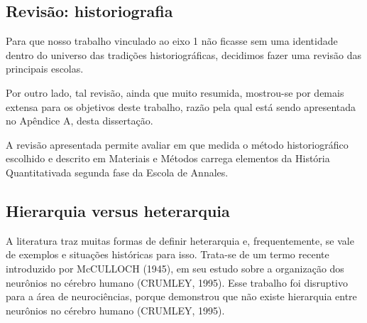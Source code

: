 \documentclass[
12pt,		%
openright,	%
twoside,  %
a4paper,			%
chapter=TITLE,		%
english,			%
french,				%
spanish,			%
brazil				%
]{USPSC-classe/USPSC}
\begin{document}
\subsection[Revis\~ao: historiografia]{Revis\~ao: historiografia}\label{Revis\~ao: historiografia}
Para que nosso trabalho vinculado ao eixo 1 n\~ao ficasse sem uma identidade dentro do universo das tradi\c{c}\~oes historiogr\'aficas, decidimos fazer uma revis\~ao das principais escolas.

















Por outro lado, tal revis\~ao, ainda que muito resumida, mostrou-se por demais extensa para os objetivos deste trabalho, raz\~ao pela qual est\'a sendo apresentada no Ap\^endice A, desta disserta\c{c}\~ao.

















A revis\~ao apresentada permite avaliar em que medida o m\'etodo historiogr\'afico escolhido e descrito em Materiais e M\'etodos carrega elementos da \textquotedbl Hist\'oria Quantitativa\textquotedbl  da segunda fase da Escola de Annales.

















\subsection[Hierarquia versus heterarquia]{Hierarquia versus heterarquia}\label{Hierarquia versus heterarquia}
A literatura traz muitas formas de definir heterarquia e, frequentemente, se vale de exemplos e situa\c{c}\~oes hist\'oricas para isso. Trata-se de um termo  recente introduzido  por  McCULLOCH (1945), em seu estudo sobre a organiza\c{c}\~ao dos neur\^onios no c\'erebro humano  (CRUMLEY, 1995). Esse trabalho foi disruptivo para a \'area de neuroci\^encias, porque demonstrou que n\~ao existe hierarquia entre neur\^onios no c\'erebro humano  (CRUMLEY, 1995).
\end{document}
